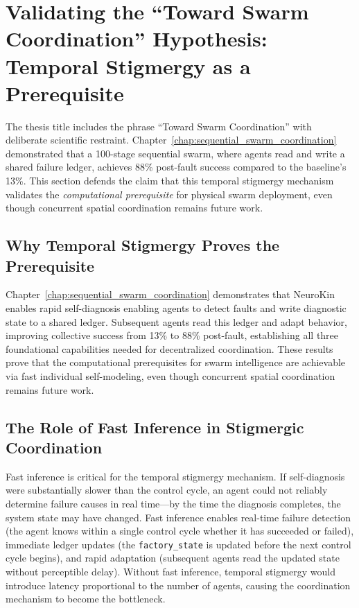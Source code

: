 \documentclass[12pt,a4paper,oneside]{report}
\begin{document}
\section{Validating the ``Toward Swarm Coordination'' Hypothesis: Temporal Stigmergy as a Prerequisite}

The thesis title includes the phrase ``Toward Swarm Coordination'' with deliberate scientific restraint. Chapter~\ref{chap:sequential_swarm_coordination} demonstrated that a 100-stage sequential swarm, where agents read and write a shared failure ledger, achieves 88\% post-fault success compared to the baseline's 13\%. This section defends the claim that this temporal stigmergy mechanism validates the \textit{computational prerequisite} for physical swarm deployment, even though concurrent spatial coordination remains future work.
\subsection{Why Temporal Stigmergy Proves the Prerequisite}
\label{subsec:why_temporal_stigmergy_proves_the_prerequisite_1_main}

Chapter~\ref{chap:sequential_swarm_coordination} demonstrates that NeuroKin enables rapid self-diagnosis enabling agents to detect faults and write diagnostic state to a shared ledger. Subsequent agents read this ledger and adapt behavior, improving collective success from 13\% to 88\% post-fault, establishing all three foundational capabilities needed for decentralized coordination. These results prove that the computational prerequisites for swarm intelligence are achievable via fast individual self-modeling, even though concurrent spatial coordination remains future work.
\subsection{The Role of Fast Inference in Stigmergic Coordination}
\label{subsec:the_role_of_fast_inference_in_stigmergic_coordination}

Fast inference is critical for the temporal stigmergy mechanism. If self-diagnosis were substantially slower than the control cycle, an agent could not reliably determine failure causes in real time---by the time the diagnosis completes, the system state may have changed. Fast inference enables real-time failure detection (the agent knows within a single control cycle whether it has succeeded or failed), immediate ledger updates (the \texttt{factory\_state} is updated before the next control cycle begins), and rapid adaptation (subsequent agents read the updated state without perceptible delay). Without fast inference, temporal stigmergy would introduce latency proportional to the number of agents, causing the coordination mechanism to become the bottleneck.
\end{document}
